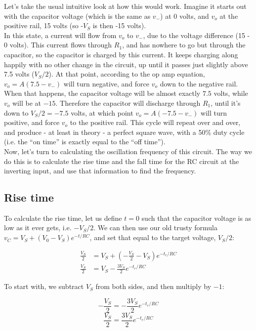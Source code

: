 \documentclass[12pt,a4paper]{report}
\begin{document}
Let's take the usual intuitive look at how this would work. Imagine it starts out with the capacitor voltage (which is the same as $v_-$) at 0 volts, and $v_o$ at the positive rail, 15 volts (so -$V_S$ is then -15 volts).\\
In this state, a current will flow from $v_o$ to $v_-$, due to the voltage difference (15 - 0 volts). This current flows through $R_1$, and has nowhere to go but through the capacitor, so the capacitor is charged by this current. It keeps charging along happily with no other change in the circuit, up until it passes just slightly above 7.5 volts ($V_S/2$). At that point, according to the op amp equation, $v_o = A(7.5 - v_-)$ will turn negative, and force $v_o$ down to the negative rail.\\
When that happens, the capacitor voltage will be almost exactly $7.5$ volts, while $v_o$ will be at $-15$. Therefore the capacitor will discharge through $R_1$, until it's down to $V_S/2 = -7.5$ volts, at which point $v_o = A(-7.5 - v_-)$ will turn positive, and force $v_o$ to the positive rail. This cycle will repeat over and over, and produce - at least in theory - a perfect square wave, with a 50\% duty cycle (i.e. the ``on time'' is exactly equal to the ``off time'').\\

Now, let's turn to calculating the oscillation frequency of this circuit. The way we do this is to calculate the rise time and the fall time for the RC circuit at the inverting input, and use that information to find the frequency.

\subsection{Rise time}
To calculate the rise time, let us define $t = 0$ such that the capacitor voltage is as low as it ever gets, i.e. $-V_S/2$. We can then use our old trusty formula $v_C = V_S + (V_0 - V_S)e^{-t/RC}$, and set that equal to the target voltage, $V_S/2$:

\begin{align*} 
 \frac{V_S}{2} &= V_S + (-\frac{V_S}{2} - V_S) e^{-t_r/RC}\\
 \frac{V_S}{2} &= V_S - \frac{3V_S}{2} e^{-t_r/RC}
\end{align*}

To start with, we subtract $V_S$ from both sides, and then multiply by $-1$:

\[ -\frac{V_S}{2} = - \frac{3V_S}{2} e^{-t_r/RC} \]
\[ \frac{V_S}{2} = \frac{3V_S}{2} e^{-t_r/RC} \]
\end{document}

